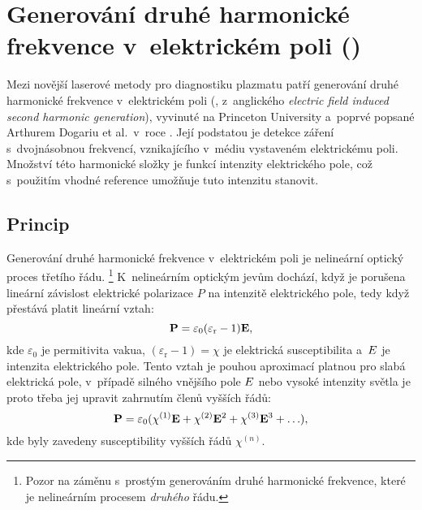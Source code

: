 \chapter[\EFISH]{Generování druhé harmonické frekvence
	v~elektrickém poli (\EFISH)}
\label{sec:efishth}

\newcommand\epol{P}
\newcommand\epolsh{P}
\newcommand\esus{\chi}
\newcommand\esusn[1]{\esus^{(#1)}}
\newcommand\eper{\varepsilon}
\newcommand\epervac{\eper_0}
\newcommand\eperrel{\eper_\text{r}}
\newcommand\elfieldlaser{E^{(\mathnormal\angfreq)}}
\newcommand\efishconst{A}
\newcommand\itylaser{I_\text{laser}}

Mezi novější laserové metody pro diagnostiku plazmatu patří
generování druhé harmonické frekvence v~elektrickém poli (\EFISH{},
z~anglického \emph{electric field induced second harmonic generation}),
vyvinuté na Princeton University a~poprvé popsané
Arthurem Dogariu et al.~v~roce \citeyear{efish-original}.
\autocite{efish-original,efish-2018}
Její podstatou je detekce záření s~dvojnásobnou frekvencí, vznikajícího
v~médiu vystaveném elektrickému poli.
Množství této harmonické složky je funkcí intenzity elektrického pole,
což s~použitím vhodné reference umožňuje tuto intenzitu stanovit.

\section{Princip}
\label{sec:efishth-principle}
Generování druhé harmonické frekvence v~elektrickém poli
je nelineární optický proces třetího řádu.%
\footnote{Pozor na záměnu s~prostým generováním druhé harmonické frekvence,
které je nelineárním procesem \emph{druhého} řádu.}
K~nelineárním optickým jevům dochází, když je porušena lineární závislost
elektrické polarizace $\epol$ na intenzitě elektrického pole,
tedy když přestává platit lineární vztah:
\begin{equation}
	\label{eq:efishth-epol-linear}
	\vec\epol = \epervac (\eperrel - 1) \vec\elfield,
\end{equation}
kde $\epervac$ je permitivita vakua,
$(\eperrel - 1) = \esus$ je elektrická susceptibilita
a~$E$ je intenzita elektrického pole.
Tento vztah je pouhou aproximací platnou pro slabá elektrická pole,
v~případě silného vnějšího pole $E$ nebo vysoké intenzity světla
je proto třeba jej upravit zahrnutím členů vyšších řádů:
\begin{equation}
	\label{eq:efishth-epol-general}
	\vec\epol = \epervac (\esusn1\vec\elfield + \esusn2\vec\elfield^2
		+ \esusn3\vec\elfield^3 + \ldots),
\end{equation}
kde byly zavedeny susceptibility vyšších řádů $\esusn{n}$.


